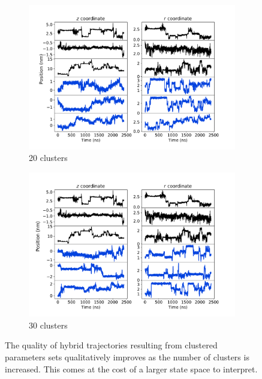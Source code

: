 \documentclass{article}
\begin{document}
  \begin{figure}[h]
  \begin{subfigure}{0.48\textwidth}
  \includegraphics[width=\textwidth]{qualitative_clustered_MET_20.pdf}
  \caption{20 clusters}\label{fig:qualitative_20}
  \end{subfigure}
  \begin{subfigure}{0.48\textwidth}
  \includegraphics[width=\textwidth]{qualitative_clustered_MET_30.pdf}
  \caption{30 clusters}\label{fig:qualitative_30}
  \end{subfigure}
  \caption{The quality of hybrid trajectories resulting from clustered parameters
  sets qualitatively improves as the number of clusters is increased. This comes 
  at the cost of a larger state space to interpret.}\label{fig:qualitative_improvement}
  \end{figure}
\end{document}
